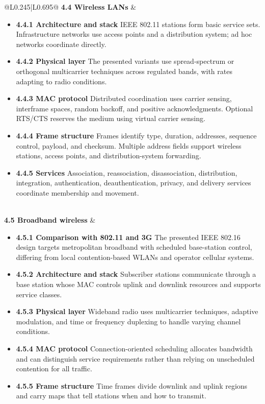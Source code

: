 \documentclass[10pt,letterpaper]{article}
\begin{document}
\begin{longtable}{@{}L{0.245\textwidth}|L{0.695\textwidth}@{}}
\textbf{4.4 Wireless LANs} & \begin{minipage}[t]{\linewidth}\raggedright \begin{itemize}\item \textbf{4.4.1 Architecture and stack} IEEE 802.11 stations form basic service sets. Infrastructure networks use access points and a distribution system; ad hoc networks coordinate directly.\item \textbf{4.4.2 Physical layer} The presented variants use spread-spectrum or orthogonal multicarrier techniques across regulated bands, with rates adapting to radio conditions.\item \textbf{4.4.3 MAC protocol} Distributed coordination uses carrier sensing, interframe spaces, random backoff, and positive acknowledgments. Optional RTS/CTS reserves the medium using virtual carrier sensing.\item \textbf{4.4.4 Frame structure} Frames identify type, duration, addresses, sequence control, payload, and checksum. Multiple address fields support wireless stations, access points, and distribution-system forwarding.\item \textbf{4.4.5 Services} Association, reassociation, disassociation, distribution, integration, authentication, deauthentication, privacy, and delivery services coordinate membership and movement.\end{itemize}\end{minipage} \\ \hline
{}\textbf{4.5 Broadband wireless} & \begin{minipage}[t]{\linewidth}\raggedright \begin{itemize}\item \textbf{4.5.1 Comparison with 802.11 and 3G} The presented IEEE 802.16 design targets metropolitan broadband with scheduled base-station control, differing from local contention-based WLANs and operator cellular systems.\item \textbf{4.5.2 Architecture and stack} Subscriber stations communicate through a base station whose MAC controls uplink and downlink resources and supports service classes.\item \textbf{4.5.3 Physical layer} Wideband radio uses multicarrier techniques, adaptive modulation, and time or frequency duplexing to handle varying channel conditions.\item \textbf{4.5.4 MAC protocol} Connection-oriented scheduling allocates bandwidth and can distinguish service requirements rather than relying on unscheduled contention for all traffic.\item \textbf{4.5.5 Frame structure} Time frames divide downlink and uplink regions and carry maps that tell stations when and how to transmit.\end{itemize}\end{minipage} \\ \hline

\end{longtable}
\end{document}
